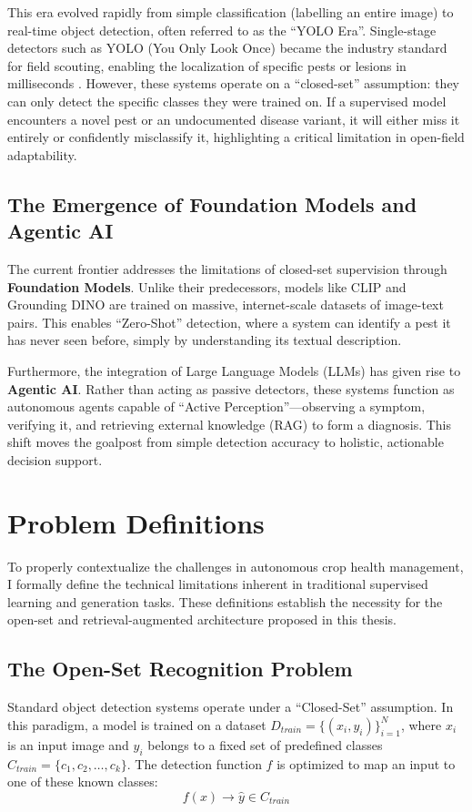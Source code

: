 This era evolved rapidly from simple classification (labelling an entire image) to real-time object detection, often referred to as the ``YOLO Era''. Single-stage detectors such as YOLO (You Only Look Once) became the industry standard for field scouting, enabling the localization of specific pests or lesions in milliseconds \cite{li2021comprehensive}. However, these systems operate on a ``closed-set'' assumption: they can only detect the specific classes they were trained on. If a supervised model encounters a novel pest or an undocumented disease variant, it will either miss it entirely or confidently misclassify it, highlighting a critical limitation in open-field adaptability.

\subsection{The Emergence of Foundation Models and Agentic AI}
The current frontier addresses the limitations of closed-set supervision through \textbf{Foundation Models}. Unlike their predecessors, models like CLIP \cite{radford2021learning} and Grounding DINO \cite{liu2023grounding} are trained on massive, internet-scale datasets of image-text pairs. This enables ``Zero-Shot'' detection, where a system can identify a pest it has never seen before, simply by understanding its textual description.

Furthermore, the integration of Large Language Models (LLMs) has given rise to \textbf{Agentic AI}. Rather than acting as passive detectors, these systems function as autonomous agents capable of ``Active Perception''---observing a symptom, verifying it, and retrieving external knowledge (RAG) to form a diagnosis. This shift moves the goalpost from simple detection accuracy to holistic, actionable decision support.


\section{Problem Definitions}

To properly contextualize the challenges in autonomous crop health management, I formally define the technical limitations inherent in traditional supervised learning and generation tasks. These definitions establish the necessity for the open-set and retrieval-augmented architecture proposed in this thesis.

\subsection{The Open-Set Recognition Problem}
Standard object detection systems operate under a ``Closed-Set'' assumption. In this paradigm, a model is trained on a dataset $D_{train} = \{(x_i, y_i)\}_{i=1}^N$, where $x_i$ is an input image and $y_i$ belongs to a fixed set of predefined classes $C_{train} = \{c_1, c_2, \dots, c_k\}$. The detection function $f$ is optimized to map an input to one of these known classes:
\[ f(x) \rightarrow \hat{y} \in C_{train} \]

